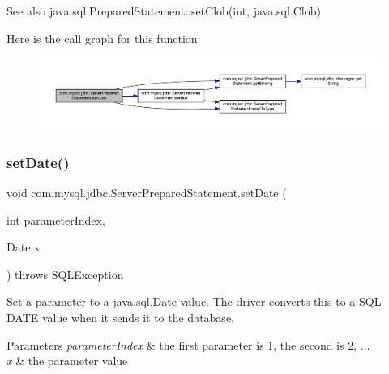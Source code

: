 \begin{DoxySeeAlso}{See also}
java.\+sql.\+Prepared\+Statement\+::set\+Clob(int, java.\+sql.\+Clob) 
\end{DoxySeeAlso}
Here is the call graph for this function\+:
\nopagebreak
\begin{figure}[H]
\begin{center}
\leavevmode
\includegraphics[width=350pt]{classcom_1_1mysql_1_1jdbc_1_1_server_prepared_statement_a2f04b85d3ca2ff2d58eb7eb6f45d4381_cgraph}
\end{center}
\end{figure}
\mbox{\label{classcom_1_1mysql_1_1jdbc_1_1_server_prepared_statement_a3a7581eb6cf9b5e8421a9b2c9843eae1}} 
\subsubsection{\texorpdfstring{set\+Date()}{setDate()}\hspace{0.1cm}{\footnotesize\ttfamily [1/2]}}
{\footnotesize\ttfamily void com.\+mysql.\+jdbc.\+Server\+Prepared\+Statement.\+set\+Date (\begin{DoxyParamCaption}\item[{int}]{parameter\+Index,  }\item[{Date}]{x }\end{DoxyParamCaption}) throws S\+Q\+L\+Exception}

Set a parameter to a java.\+sql.\+Date value. The driver converts this to a S\+QL D\+A\+TE value when it sends it to the database.


\begin{DoxyParams}{Parameters}
{\em parameter\+Index} & the first parameter is 1, the second is 2, ... \\
\hline
{\em x} & the parameter value\\
\hline
\end{DoxyParams}

